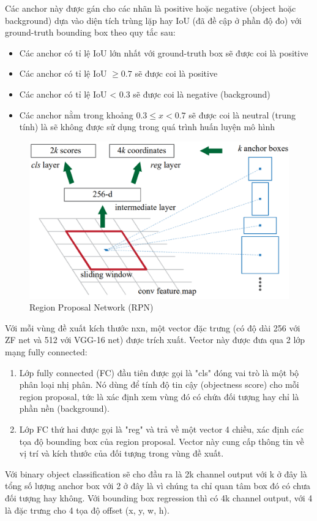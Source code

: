 Các anchor này được gán cho các nhãn là positive hoặc negative (object hoặc background) dựa vào diện tích trùng lặp hay IoU (đã đề cập ở phần độ đo) với ground-truth bounding box theo quy tắc sau:
\begin{itemize}[noitemsep, topsep=0pt, leftmargin=1.25em, label={$-$}]
    \item Các anchor có tỉ lệ IoU lớn nhất với ground-truth box sẽ được coi là positive
    \item Các anchor có tỉ lệ IoU \(\geq 0.7\) sẽ được coi là positive
    \item Các anchor có tỉ lệ IoU < 0.3 sẽ được coi là negative (background)
    \item Các anchor nằm trong khoảng \(0.3 \leq x < 0.7\) sẽ được coi là neutral (trung tính) là sẽ không được sử dụng trong quá trình huấn luyện mô hình
\end{itemize}
\graphicspath{{figures/}}
\begin{figure}[h!]
  \centering
  \includegraphics[scale=0.45]{graphics/rpn.png}
  \caption{Region Proposal Network (RPN)}
\end{figure}

Với mỗi vùng đề xuất kích thước nxn, một vector đặc trưng (có độ dài 256 với ZF net và 512 với VGG-16 net) được trích xuất. Vector này được đưa qua 2 lớp mạng fully connected:
\begin{enumerate}[topsep=0pt,itemsep=-1ex,partopsep=1ex,parsep=1ex]
    \item Lớp fully connected (FC) đầu tiên được gọi là "cls" đóng vai trò là một bộ phân loại nhị phân. Nó dùng để tính độ tin cậy (objectness score) cho mỗi region proposal, tức là xác định xem vùng đó có chứa đối tượng hay chỉ là phần nền (background).
    \item Lớp FC thứ hai được gọi là "reg" và trả về một vector 4 chiều, xác định các tọa độ bounding box của region proposal. Vector này cung cấp thông tin về vị trí và kích thước của đối tượng trong vùng đề xuất.
\end{enumerate}
Với binary object classification sẽ cho đầu ra là 2k channel output với k ở đây là tổng số lượng anchor box với 2 ở đây là vì chúng ta chỉ quan tâm box đó có chưa đối tượng hay không. Với bounding box regression thì có 4k channel output, với 4 là đặc trưng cho 4 tọa độ offset (x, y, w, h). 

